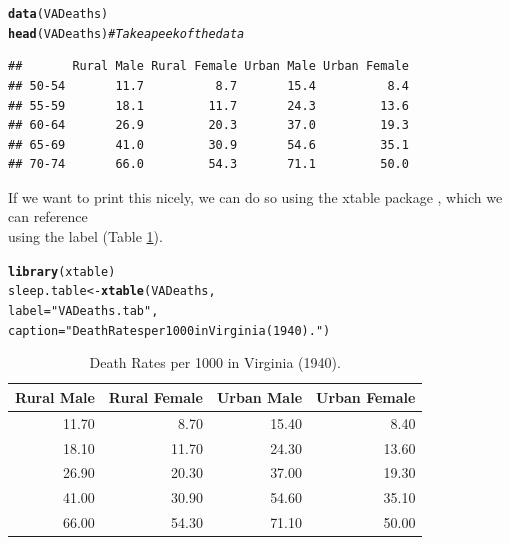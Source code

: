 \documentclass{article}\usepackage[]{graphicx}\usepackage[]{xcolor}
\makeatletter
\newcommand{\hlsng}[1]{\textcolor[rgb]{0.192,0.494,0.8}{#1}}%
\newcommand{\hlcom}[1]{\textcolor[rgb]{0.678,0.584,0.686}{\textit{#1}}}%
\newcommand{\hldef}[1]{\textcolor[rgb]{0.345,0.345,0.345}{#1}}%
\newcommand{\hlkwb}[1]{\textcolor[rgb]{0.69,0.353,0.396}{#1}}%
\newcommand{\hlkwc}[1]{\textcolor[rgb]{0.333,0.667,0.333}{#1}}%
\newcommand{\hlkwd}[1]{\textcolor[rgb]{0.737,0.353,0.396}{\textbf{#1}}}%
\newenvironment{kframe}{%
 \def\at@end@of@kframe{}%
 \ifinner\ifhmode%
  \def\at@end@of@kframe{\end{minipage}}%
  \begin{minipage}{\columnwidth}%
 \fi\fi%
 \def\FrameCommand##1{\hskip\@totalleftmargin \hskip-\fboxsep
 \colorbox{shadecolor}{##1}\hskip-\fboxsep
     \hskip-\linewidth \hskip-\@totalleftmargin \hskip\columnwidth}%
 \MakeFramed {\advance\hsize-\width
   \@totalleftmargin\z@ \linewidth\hsize
   \@setminipage}}%
 {\par\unskip\endMakeFramed%
 \at@end@of@kframe}
\newenvironment{knitrout}{}{} %
\makeatother
\begin{document}
\begin{multicols}{2}
\begin{knitrout}\scriptsize
{}\color{fgcolor}\begin{kframe}
\begin{alltt}
 \hlkwd{data}\hldef{(VADeaths)}
 \hlkwd{head}\hldef{(VADeaths)} \hlcom{#Takeapeekofthedata}
\end{alltt}
\begin{verbatim}
##       Rural Male Rural Female Urban Male Urban Female
## 50-54       11.7          8.7       15.4          8.4
## 55-59       18.1         11.7       24.3         13.6
## 60-64       26.9         20.3       37.0         19.3
## 65-69       41.0         30.9       54.6         35.1
## 70-74       66.0         54.3       71.1         50.0
\end{verbatim}
\end{kframe}
\end{knitrout}
If we want to print this nicely, we can do so using the
xtable package \citep{xtable}, which we can reference \\
using the label (Table \hyperref[plot1]{1}).
\begin{knitrout}\scriptsize
{}\color{fgcolor}\begin{kframe}
\begin{alltt}
 \hlkwd{library}\hldef{(xtable)}
 \hldef{sleep.table} \hlkwb{<-} \hlkwd{xtable}\hldef{(VADeaths,}
                     \hlkwc{label}\hldef{=}\hlsng{"VADeaths.tab"}\hldef{,}
                     \hlkwc{caption}\hldef{=}\hlsng{"Death Rates per 1000 in Virginia (1940)."}\hldef{)}
\end{alltt}
\end{kframe}
\end{knitrout}

\begin{table}[H]
\centering
\begingroup\small
\begin{tabular}{rrrr}
  \hline
Rural Male & Rural Female & Urban Male & Urban Female \\ 
  \hline
11.70 & 8.70 & 15.40 & 8.40 \\ 
  18.10 & 11.70 & 24.30 & 13.60 \\ 
  26.90 & 20.30 & 37.00 & 19.30 \\ 
  41.00 & 30.90 & 54.60 & 35.10 \\ 
  66.00 & 54.30 & 71.10 & 50.00 \\ 
   \hline
\end{tabular}
\endgroup
\caption{Death Rates per 1000 in Virginia (1940).} 
\label{VADeaths.tab}
\end{table}


\vspace{2em}
\begin{tiny}

\end{tiny}
\end{multicols}
\end{document}
